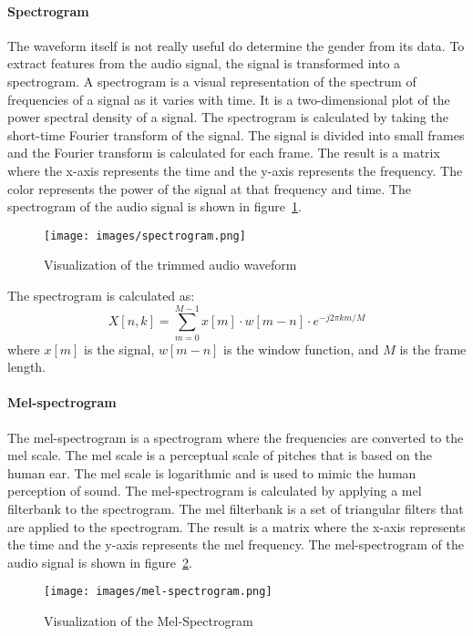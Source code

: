 \paragraph{Spectrogram}
The waveform itself is not really useful do determine the gender from its data. To extract features from the audio signal, the signal is transformed into a spectrogram. A spectrogram is a visual representation of the spectrum of frequencies of a signal as it varies with time. It is a two-dimensional plot of the power spectral density of a signal. The spectrogram is calculated by taking the short-time Fourier transform of the signal. The signal is divided into small frames and the Fourier transform is calculated for each frame. The result is a matrix where the x-axis represents the time and the y-axis represents the frequency. The color represents the power of the signal at that frequency and time. The spectrogram of the audio signal is shown in figure~\ref{fig:spectrogram}.

\begin{figure}[h] %
    \centering %
    \texttt{[image: images/spectrogram.png]}
    \caption{Visualization of the trimmed audio waveform} %
    \label{fig:spectrogram} %
\end{figure}

The spectrogram is calculated as:
\[
X[n, k] = \sum_{m=0}^{M-1} x[m] \cdot w[m-n] \cdot e^{-j2\pi km/M}
\]
where \(x[m]\) is the signal, \(w[m-n]\) is the window function, and \(M\) is the frame length.


\paragraph{Mel-spectrogram}
The mel-spectrogram is a spectrogram where the frequencies are converted to the mel scale. The mel scale is a perceptual scale of pitches that is based on the human ear. The mel scale is logarithmic and is used to mimic the human perception of sound. The mel-spectrogram is calculated by applying a mel filterbank to the spectrogram. The mel filterbank is a set of triangular filters that are applied to the spectrogram. The result is a matrix where the x-axis represents the time and the y-axis represents the mel frequency. The mel-spectrogram of the audio signal is shown in figure~\ref{fig:mel-spectrogram}.

\begin{figure}[h] %
    \centering %
    \texttt{[image: images/mel-spectrogram.png]}
    \caption{Visualization of the Mel-Spectrogram} %
    \label{fig:mel-spectrogram} %
\end{figure}

